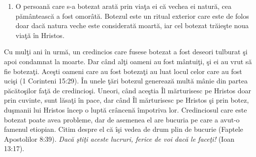 \begin{enumerate}
	\item O persoană care s-a botezat arată prin viaţa ei că vechea ei natură, cea pământească a fost omorâtă. Botezul este un ritual exterior care este de folos doar dacă natura veche este considerată moartă, iar cel botezat trăieşte noua viaţă în Hristos. 
	
\end{enumerate}

Cu mulţi ani în urmă, un credincios care fusese botezat a fost deseori tulburat şi apoi condamnat la moarte. Dar când alţi oameni au fost mântuiţi, şi ei au vrut să fie botezaţi. Aceşti oameni care au fost botezaţi au luat locul celor care au fost ucişi (1 Corinteni 15:29). În unele ţări botezul generează multă mânie din partea păcătoşilor faţă de credincioşi. Uneori, când aceştia Îl mărturisesc pe Hristos doar prin cuvinte, sunt lăsaţi în pace, dar când Îl mărturisesc pe Hristos şi prin botez, duşmanii lui Hristos încep o luptă crâncenă împotriva lor. Credinciosul care este botezat poate avea probleme, dar de asemenea el are bucuria pe care a avut-o famenul etiopian. Citim despre el că îşi vedea de drum plin de bucurie (Faptele Apostolilor 8:39).
\newline
\newline
\textit{Dacă ştiţi aceste lucruri, ferice de voi dacă le faceţi!} (Ioan 13:17).
